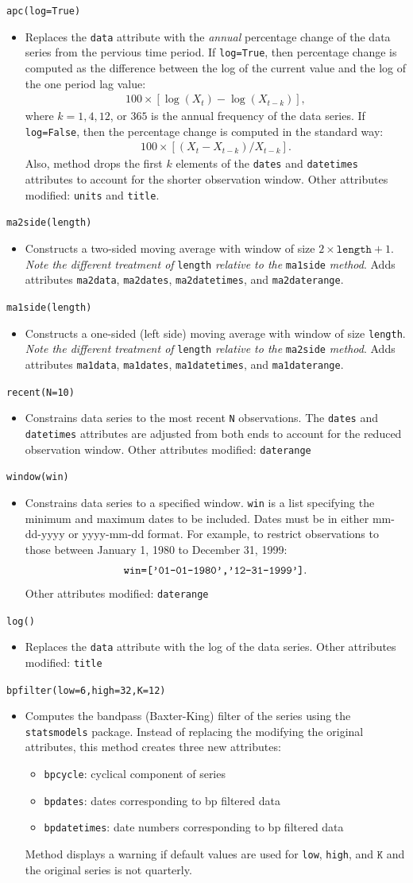 \documentclass[11pt,fleqn]{article}
\newcommand{\EE}{\begin{eqnarray}}
\newcommand{\FF}{\end{eqnarray}}
\newcommand{\IZ}{\begin{itemize}}
\newcommand{\ZI}{\end{itemize}}
\newcommand{\itemb}{\item[]}
\newcommand{\ttt}{\texttt}
\begin{document}
	\itemb \ttt{apc(log=True)}
		\IZ
		\itemb Replaces the \ttt{data} attribute with the \emph{annual} percentage change of the data series from the pervious time period. If \ttt{log=True}, then percentage change is computed as the difference between the log of the current value and the log of the one period lag value:
			\EE
			100 \times \left[\log(X_t) - \log(X_{t-k})\right],
			\FF
		where $k=1,4,12$, or $365$ is the annual frequency of the data series. If \ttt{log=False}, then the percentage change is computed in the standard way:
			\EE
			100 \times \left[(X_t - X_{t-k})/X_{t-k}\right].
			\FF
		Also, method drops the first $k$ elements of the \ttt{dates} and \ttt{datetimes} attributes to account for the shorter observation window. Other attributes modified: \ttt{units} and \ttt{title}.
		\ZI
	
	\itemb \ttt{ma2side(length)}
		\IZ
		\itemb Constructs a two-sided moving average with window of size $2\times\ttt{length}+1$. \emph{Note the different treatment of} \ttt{length} \emph{relative to the} \ttt{ma1side} \emph{method}. Adds attributes \ttt{ma2data}, \ttt{ma2dates}, \ttt{ma2datetimes}, and \ttt{ma2daterange}.
		\ZI
		
	\itemb \ttt{ma1side(length)}
		\IZ
		\itemb Constructs a one-sided (left side) moving average with window of size \ttt{length}. \emph{Note the different treatment of} \ttt{length} \emph{relative to the} \ttt{ma2side} \emph{method}. Adds attributes \ttt{ma1data}, \ttt{ma1dates}, \ttt{ma1datetimes}, and \ttt{ma1daterange}.
		\ZI
		
	\itemb \ttt{recent(N=10)}
		\IZ
		\itemb Constrains data series to the most recent \ttt{N} observations. The \ttt{dates} and \ttt{datetimes} attributes are adjusted from both ends to account for the reduced observation window. Other attributes modified: \ttt{daterange}
		\ZI
		
	\itemb \ttt{window(win)}
		\IZ
		\itemb Constrains data series to a specified window. \ttt{win} is a list specifying the minimum and maximum dates to be included. Dates must be in either mm-dd-yyyy or yyyy-mm-dd format. For example, to restrict observations to those between January 1, 1980 to December 31, 1999:
			\EE
			\verb!win=['01-01-1980','12-31-1999']!.
			\FF
		Other attributes modified: \ttt{daterange}
		\ZI
		
	\itemb \ttt{log()}
		\IZ
		\itemb Replaces the \ttt{data} attribute with the log of the data series. Other attributes modified: \ttt{title}
		\ZI
		
	\itemb \ttt{bpfilter(low=6,high=32,K=12)}
		\IZ
		\itemb Computes the bandpass (Baxter-King) filter of the series using the \ttt{statsmodels} package. Instead of replacing the modifying the original attributes, this method creates three new attributes:
			\IZ
            \itemb \ttt{bpcycle}: cyclical component of series
            \itemb \ttt{bpdates}: dates corresponding to bp filtered data
            \itemb \ttt{bpdatetimes}: date numbers corresponding to bp filtered data
            \ZI
       Method displays a warning if default values are used for \ttt{low}, \ttt{high}, and $\ttt{K}$ and the original series is not quarterly.
		\ZI
	
\end{document}
